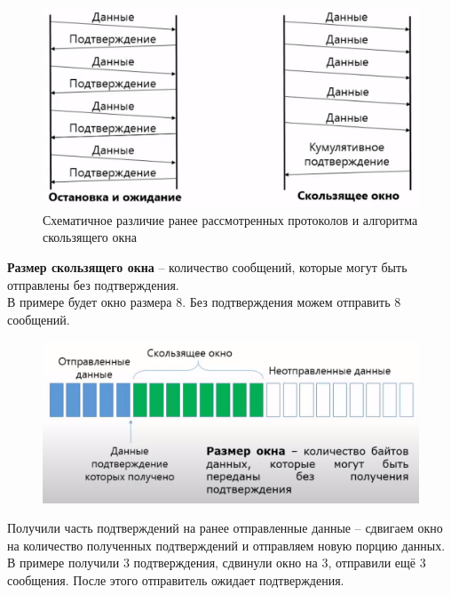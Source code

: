 \begin{figure}[H] \centering
	\includegraphics[scale = 0.35]{18/send_types.png}
	\caption{Схематичное различие ранее рассмотренных протоколов и алгоритма скользящего окна}
\end{figure}

\textbf{Размер скользящего окна} -- количество сообщений, которые могут быть отправлены без подтверждения. \\
В примере будет окно размера 8. Без подтверждения можем отправить 8 сообщений.
\begin{figure}[H] \centering
	\includegraphics[scale = 0.3]{18/window_1.png}
\end{figure}

Получили часть подтверждений на ранее отправленные данные -- сдвигаем окно на количество полученных подтверждений и отправляем новую порцию данных. В примере получили 3 подтверждения, сдвинули окно на 3, отправили ещё 3 сообщения. После этого отправитель ожидает подтверждения.

